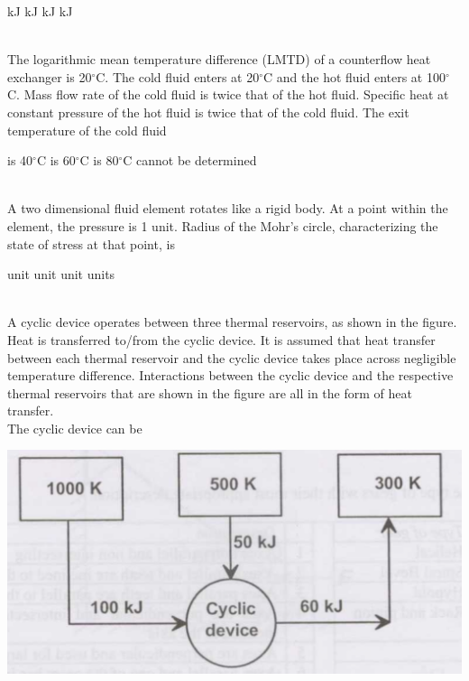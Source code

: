 \documentclass[addpoints,11pt]{exam}
\begin{document}
\begin{questions}
        \begin{oneparchoices}
             kJ
             kJ
             kJ
             kJ
        \end{oneparchoices}\\

        \question The logarithmic mean temperature difference (LMTD) of a counterflow heat exchanger is 20$^\circ$C. The cold fluid enters at 20$^\circ$C and the hot fluid enters at 100$^\circ$C. Mass flow rate of the cold fluid is twice that of the hot fluid. Specific heat at constant pressure of the hot fluid is twice that of the cold fluid. The exit temperature of the cold fluid\\

        \begin{oneparchoices}
            \choice is 40$^\circ$C
            \choice is 60$^\circ$C
            \choice is 80$^\circ$C
            \choice cannot be determined
        \end{oneparchoices}\\

        \question A two dimensional fluid element rotates like a rigid body. At a point within the element, the pressure is 1 unit. Radius of the Mohr's circle, characterizing the state of stress at that point, is\\

        \begin{oneparchoices}
             unit
             unit
             unit
             units
        \end{oneparchoices}\\

        \question A cyclic device operates between three thermal reservoirs, as shown in the figure. Heat is transferred to/from the cyclic device. It is assumed that heat transfer between each thermal reservoir and the cyclic device takes place across negligible temperature difference. Interactions between the cyclic device and the respective thermal reservoirs that are shown in the figure are all in the form of heat transfer.\\
        The cyclic device can be

        \begin{center}
            \includegraphics[scale=0.3]{q47}
        \end{center}


\end{questions}
\end{document}
